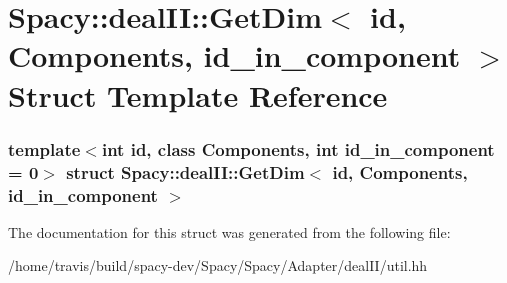 \hypertarget{structSpacy_1_1dealII_1_1GetDim}{\section{\-Spacy\-:\-:deal\-I\-I\-:\-:\-Get\-Dim$<$ id, \-Components, id\-\_\-in\-\_\-component $>$ \-Struct \-Template \-Reference}
\label{structSpacy_1_1dealII_1_1GetDim}
}
\subsubsection*{template$<$int id, class Components, int id\-\_\-in\-\_\-component = 0$>$ struct Spacy\-::deal\-I\-I\-::\-Get\-Dim$<$ id, Components, id\-\_\-in\-\_\-component $>$}



\-The documentation for this struct was generated from the following file\-:\begin{DoxyCompactItemize}
\item 
/home/travis/build/spacy-\/dev/\-Spacy/\-Spacy/\-Adapter/deal\-I\-I/util.\-hh\end{DoxyCompactItemize}
